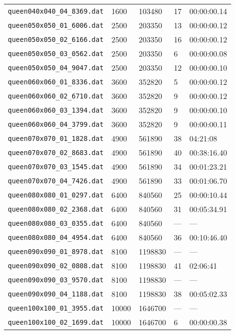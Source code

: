 \documentclass{article}
\begin{document}
\begin{table}
\begin{tabular}{y{3.6cm}x{1cm}x{1.5cm}x{1.5cm}y{1.5cm}}
    \verb|queen040x040_04_8369.dat| &  1600 &   103480 &  17 & 00:00:00.14 \\
    \verb|queen050x050_01_6006.dat| &  2500 &   203350 &  13 & 00:00:00.12 \\
    \verb|queen050x050_02_6166.dat| &  2500 &   203350 &  16 & 00:00:00.12 \\
    \verb|queen050x050_03_0562.dat| &  2500 &   203350 &   6 & 00:00:00.08 \\
    \verb|queen050x050_04_9047.dat| &  2500 &   203350 &  12 & 00:00:00.10 \\
    \verb|queen060x060_01_8336.dat| &  3600 &   352820 &   5 & 00:00:00.12 \\
    \verb|queen060x060_02_6710.dat| &  3600 &   352820 &   9 & 00:00:00.12 \\
    \verb|queen060x060_03_1394.dat| &  3600 &   352820 &   9 & 00:00:00.10 \\
    \verb|queen060x060_04_3799.dat| &  3600 &   352820 &   9 & 00:00:00.11 \\
    \verb|queen070x070_01_1828.dat| &  4900 &   561890 &  38 & 04:21:08 \\
    \verb|queen070x070_02_8683.dat| &  4900 &   561890 &  40 & 00:38:16.40 \\
    \verb|queen070x070_03_1545.dat| &  4900 &   561890 &  34 & 00:01:23.21 \\
    \verb|queen070x070_04_7426.dat| &  4900 &   561890 &  33 & 00:01:06.70 \\
    \verb|queen080x080_01_0297.dat| &  6400 &   840560 &  25 & 00:00:10.44 \\
    \verb|queen080x080_02_2368.dat| &  6400 &   840560 &  31 & 00:05:34.91 \\
    \verb|queen080x080_03_0355.dat| &  6400 &   840560 & --- & --- \\
    \verb|queen080x080_04_4954.dat| &  6400 &   840560 &  36 & 00:10:46.40 \\
    \verb|queen090x090_01_8978.dat| &  8100 &  1198830 & --- & --- \\
    \verb|queen090x090_02_0808.dat| &  8100 &  1198830 &  41 & 02:06:41 \\
    \verb|queen090x090_03_9570.dat| &  8100 &  1198830 & --- & --- \\
    \verb|queen090x090_04_1188.dat| &  8100 &  1198830 &  38 & 00:05:02.33 \\
    \verb|queen100x100_01_3955.dat| & 10000 &  1646700 & --- & --- \\
    \verb|queen100x100_02_1699.dat| & 10000 &  1646700 &   6 & 00:00:00.38 \\

\end{tabular}
\end{table}
\end{document}

